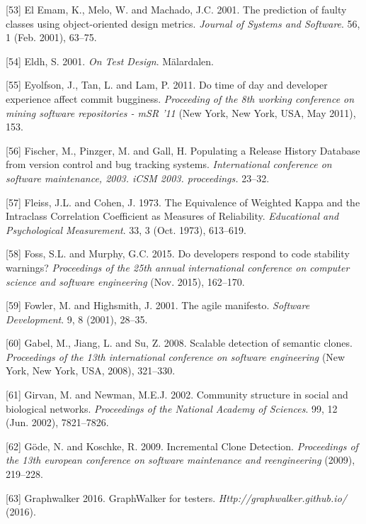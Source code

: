 \documentclass[12pt]{report}
\begin{document}
\hypertarget{ref-ElEmam2001}{}
{[}53{]} El Emam, K., Melo, W. and Machado, J.C. 2001. The prediction of
faulty classes using object-oriented design metrics. \emph{Journal of
Systems and Software}. 56, 1 (Feb. 2001), 63--75.

\hypertarget{ref-Eldh2001}{}
{[}54{]} Eldh, S. 2001. \emph{On Test Design}. Mälardalen.

\hypertarget{ref-Eyolfson2011}{}
{[}55{]} Eyolfson, J., Tan, L. and Lam, P. 2011. Do time of day and
developer experience affect commit bugginess. \emph{Proceeding of the
8th working conference on mining software repositories - mSR '11} (New
York, New York, USA, May 2011), 153.

\hypertarget{ref-Fischer}{}
{[}56{]} Fischer, M., Pinzger, M. and Gall, H. Populating a Release
History Database from version control and bug tracking systems.
\emph{International conference on software maintenance, 2003. iCSM 2003.
proceedings.} 23--32.

\hypertarget{ref-Fleiss1973}{}
{[}57{]} Fleiss, J.L. and Cohen, J. 1973. The Equivalence of Weighted
Kappa and the Intraclass Correlation Coefficient as Measures of
Reliability. \emph{Educational and Psychological Measurement}. 33, 3
(Oct. 1973), 613--619.

\hypertarget{ref-Foss2015}{}
{[}58{]} Foss, S.L. and Murphy, G.C. 2015. Do developers respond to code
stability warnings? \emph{Proceedings of the 25th annual international
conference on computer science and software engineering} (Nov. 2015),
162--170.

\hypertarget{ref-fowler2001agile}{}
{[}59{]} Fowler, M. and Highsmith, J. 2001. The agile manifesto.
\emph{Software Development}. 9, 8 (2001), 28--35.

\hypertarget{ref-Gabel2008}{}
{[}60{]} Gabel, M., Jiang, L. and Su, Z. 2008. Scalable detection of
semantic clones. \emph{Proceedings of the 13th international conference
on software engineering} (New York, New York, USA, 2008), 321--330.

\hypertarget{ref-Girvan2002}{}
{[}61{]} Girvan, M. and Newman, M.E.J. 2002. Community structure in
social and biological networks. \emph{Proceedings of the National
Academy of Sciences}. 99, 12 (Jun. 2002), 7821--7826.

\hypertarget{ref-Gode2009}{}
{[}62{]} Göde, N. and Koschke, R. 2009. Incremental Clone Detection.
\emph{Proceedings of the 13th european conference on software
maintenance and reengineering} (2009), 219--228.

\hypertarget{ref-Graphwalker2016}{}
{[}63{]} Graphwalker 2016. GraphWalker for testers.
\emph{Http://graphwalker.github.io/} (2016).
\end{document}
